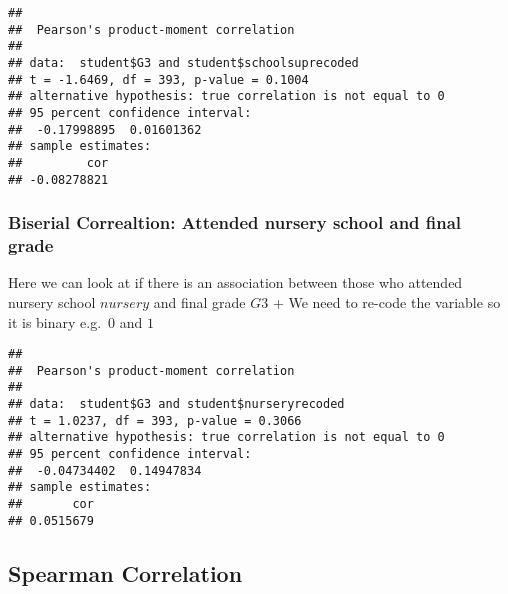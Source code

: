 \documentclass[
]{book}
\newenvironment{Shaded}{\begin{snugshade}}{\end{snugshade}}
\newcommand{\DecValTok}[1]{\textcolor[rgb]{0.00,0.00,0.81}{#1}}
\newcommand{\FunctionTok}[1]{\textcolor[rgb]{0.13,0.29,0.53}{\textbf{#1}}}
\newcommand{\NormalTok}[1]{#1}
\newcommand{\OtherTok}[1]{\textcolor[rgb]{0.56,0.35,0.01}{#1}}
\newcommand{\SpecialCharTok}[1]{\textcolor[rgb]{0.81,0.36,0.00}{\textbf{#1}}}
\newcommand{\StringTok}[1]{\textcolor[rgb]{0.31,0.60,0.02}{#1}}
\theoremstyle{definition}
\theoremstyle{definition}
\theoremstyle{definition}
\theoremstyle{definition}
\theoremstyle{remark}
\begin{document}
\begin{verbatim}
## 
##  Pearson's product-moment correlation
## 
## data:  student$G3 and student$schoolsuprecoded
## t = -1.6469, df = 393, p-value = 0.1004
## alternative hypothesis: true correlation is not equal to 0
## 95 percent confidence interval:
##  -0.17998895  0.01601362
## sample estimates:
##         cor 
## -0.08278821
\end{verbatim}

\hypertarget{biserial-correaltion-attended-nursery-school-and-final-grade}{%
\subsubsection{Biserial Correaltion: Attended nursery school and final grade}\label{biserial-correaltion-attended-nursery-school-and-final-grade}}

Here we can look at if there is an association between those who attended nursery school \(nursery\) and final grade \(G3\)
+ We need to re-code the variable so it is binary e.g.~\(0\) and \(1\)

\begin{Shaded}
\end{Shaded}

\begin{verbatim}
## 
##  Pearson's product-moment correlation
## 
## data:  student$G3 and student$nurseryrecoded
## t = 1.0237, df = 393, p-value = 0.3066
## alternative hypothesis: true correlation is not equal to 0
## 95 percent confidence interval:
##  -0.04734402  0.14947834
## sample estimates:
##       cor 
## 0.0515679
\end{verbatim}

\hypertarget{spearman-correlation}{%
\subsection{Spearman Correlation}\label{spearman-correlation}}
\end{document}
